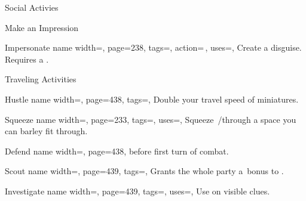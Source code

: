 \begin{PageFront}
\begin{Tables}{\frontTableHeight}
\begin{Table}{Social Activies}
\begin{entry}{Make an Impression}
            \end{entry}
            \begin{entry}{Impersonate}{%
                name width=\activityLength,%
                page=238,
                tags=\Concentrate\Manipulate,
                action=\,,
                uses={\Deception[tags={S}]},
            }
                Create a disguise. Requires a . \hfill {} 
            \end{entry}
        \end{Table}
        \TableSpace
        \begin{Table}{Traveling Activities}
            \begin{entry}{Hustle}{%
                name width=\activityLength,%
                page=438,
                tags=\Move,
            }
                Double your travel speed of  miniatures.\quad {}
            \end{entry}
            \begin{entry}{Squeeze}{%
                name width=\activityLength,%
                page=233,
                tags=\Move,
                uses={\Acrobatics[tags=T]},
            }
                Squeeze \,\Feet/\Min through a space you can barley fit through. \hfill {}
            \end{entry}
            \begin{entry}{Defend}{%
                name width=\activityLength,%
                page=438,
            }
                 before first turn of combat.\hfill
            \end{entry}
            \begin{entry}{Scout}{%
                name width=\activityLength,%
                page=439,
                tags=\Concentrate,
            }
                Grants the whole party a \,\Cirm bonus to .
            \end{entry}
            \breakLine
            \begin{entry}{Investigate}{%
                name width=\activityLength,%
                page=439,
                tags=\Concentrate,
                uses={\VariousKnowledge[tags=S]},
            }
                Use  on visible clues.\hfill {}\quad{}

\end{entry}
\end{Table}
\end{Tables}
\end{PageFront}
